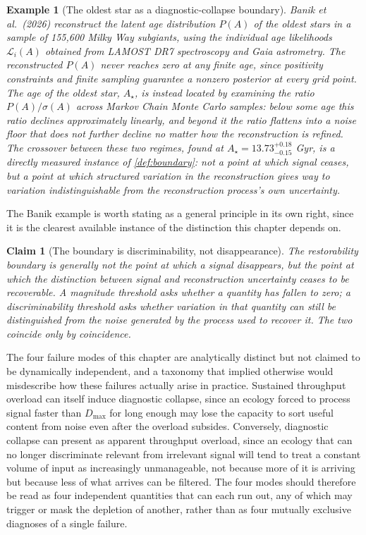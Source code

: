 \documentclass[12pt]{report}
\newtheorem{claim}[definition]{Claim}
\newtheorem{example}[definition]{Example}
\begin{document}
\begin{example}[The oldest star as a diagnostic-collapse boundary]
\label{ex:banik}
Banik et al.\ (2026) reconstruct the latent age distribution $P(A)$ of the
oldest stars in a sample of 155{,}600 Milky Way subgiants, using the
individual age likelihoods $\mathcal{L}_i(A)$ obtained from LAMOST DR7
spectroscopy and Gaia astrometry. The reconstructed $P(A)$ never reaches
zero at any finite age, since positivity constraints and finite sampling
guarantee a nonzero posterior at every grid point. The age of the oldest
star, $A_\star$, is instead located by examining the ratio $P(A)/\sigma(A)$
across Markov Chain Monte Carlo samples: below some age this ratio
declines approximately linearly, and beyond it the ratio flattens into a
noise floor that does not further decline no matter how the reconstruction
is refined. The crossover between these two regimes, found at
$A_\star = 13.73^{+0.18}_{-0.15}$ Gyr, is a directly measured instance of
\cref{def:boundary}: not a point at which signal ceases, but a point at
which structured variation in the reconstruction gives way to variation
indistinguishable from the reconstruction process's own uncertainty.
\end{example}

The Banik example is worth stating as a general principle in its own
right, since it is the clearest available instance of the distinction this
chapter depends on.

\begin{claim}[The boundary is discriminability, not disappearance]
\label{claim:boundary-is-discriminability}
The restorability boundary is generally not the point at which a signal
disappears, but the point at which the distinction between signal and
reconstruction uncertainty ceases to be recoverable. A magnitude threshold
asks whether a quantity has fallen to zero; a discriminability threshold
asks whether variation in that quantity can still be distinguished from
the noise generated by the process used to recover it. The two coincide
only by coincidence.
\end{claim}

The four failure modes of this chapter are analytically distinct but not
claimed to be dynamically independent, and a taxonomy that implied
otherwise would misdescribe how these failures actually arise in practice.
Sustained throughput overload can itself induce diagnostic collapse, since
an ecology forced to process signal faster than $D_{\max}$ for long enough
may lose the capacity to sort useful content from noise even after the
overload subsides. Conversely, diagnostic collapse can present as apparent
throughput overload, since an ecology that can no longer discriminate
relevant from irrelevant signal will tend to treat a constant volume of
input as increasingly unmanageable, not because more of it is arriving but
because less of what arrives can be filtered. The four modes should
therefore be read as four independent quantities that can each run out,
any of which may trigger or mask the depletion of another, rather than as
four mutually exclusive diagnoses of a single failure.
\end{document}
